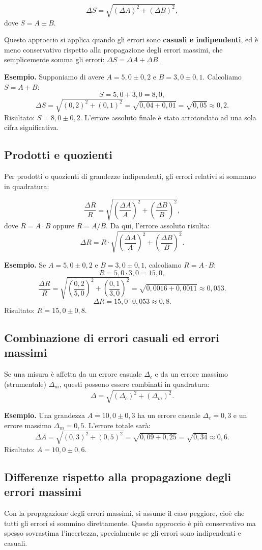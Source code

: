 \[
\Delta S = \sqrt{(\Delta A)^2 + (\Delta B)^2},
\]
dove $S = A \pm B$.

Questo approccio si applica quando gli errori sono \textbf{casuali e indipendenti}, ed è meno conservativo rispetto alla propagazione degli errori massimi, che semplicemente somma gli errori: $\Delta S = \Delta A + \Delta B$.

\textbf{Esempio.}
Supponiamo di avere $A = 5,0 \pm 0,2$ e $B = 3,0 \pm 0,1$. Calcoliamo $S = A + B$:
\[
S = 5,0 + 3,0 = 8,0,
\]
\[
\Delta S = \sqrt{(0,2)^2 + (0,1)^2} = \sqrt{0,04 + 0,01} = \sqrt{0,05} \approx 0,2.
\]
Risultato: $S = 8,0 \pm 0,2$.  
L'errore assoluto finale è stato arrotondato ad una sola cifra significativa.

\subsection{Prodotti e quozienti}
Per prodotti o quozienti di grandezze indipendenti, gli errori relativi si sommano in quadratura:

\[
\frac{\Delta R}{R} = \sqrt{\left(\frac{\Delta A}{A}\right)^2 + \left(\frac{\Delta B}{B}\right)^2},
\]
dove $R = A \cdot B$ oppure $R = A / B$.  
Da qui, l'errore assoluto risulta:
\[
\Delta R = R \cdot \sqrt{\left(\frac{\Delta A}{A}\right)^2 + \left(\frac{\Delta B}{B}\right)^2}.
\]

\textbf{Esempio.}
Se $A = 5,0 \pm 0,2$ e $B = 3,0 \pm 0,1$, calcoliamo $R = A \cdot B$:
\[
R = 5,0 \cdot 3,0 = 15,0,
\]
\[
\frac{\Delta R}{R} = \sqrt{\left(\frac{0,2}{5,0}\right)^2 + \left(\frac{0,1}{3,0}\right)^2} = \sqrt{0,0016 + 0,0011} \approx 0,053.
\]
\[
\Delta R = 15,0 \cdot 0,053 \approx 0,8.
\]
Risultato: $R = 15,0 \pm 0,8$.

\subsection{Combinazione di errori casuali ed errori massimi}
Se una misura è affetta da un errore casuale $\Delta_c$ e da un errore massimo (strumentale) $\Delta_m$, questi possono essere combinati in quadratura:
\[
\Delta = \sqrt{(\Delta_c)^2 + (\Delta_m)^2}.
\]

\textbf{Esempio.}
Una grandezza $A = 10,0 \pm 0,3$ ha un errore casuale $\Delta_c = 0,3$ e un errore massimo $\Delta_m = 0,5$. L'errore totale sarà:
\[
\Delta A = \sqrt{(0,3)^2 + (0,5)^2} = \sqrt{0,09 + 0,25} = \sqrt{0,34} \approx 0,6.
\]
Risultato: $A = 10,0 \pm 0,6$.

\subsection{Differenze rispetto alla propagazione degli errori massimi}
Con la propagazione degli errori massimi, si assume il caso peggiore, cioè che tutti gli errori si sommino direttamente. Questo approccio è più conservativo ma spesso sovrastima l'incertezza, specialmente se gli errori sono indipendenti e casuali.

